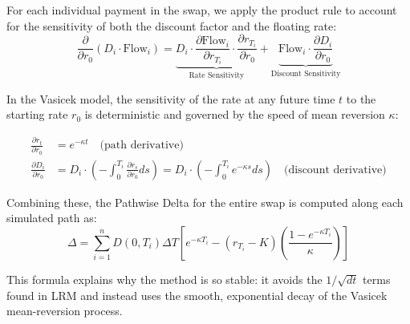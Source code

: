 For each individual payment in the swap, we apply the product rule to account for the sensitivity of both the discount factor and the floating rate:
\begin{equation}
\frac{\partial}{\partial r_0}(D_i\cdot\text{Flow}_i)=\underbrace{D_i\cdot\frac{\partial\text{Flow}_i}{\partial r_{T_i}}\cdot\frac{\partial r_{T_i}}{\partial r_0}}_{\text{Rate Sensitivity}}+\underbrace{\text{Flow}_i\cdot\frac{\partial D_i}{\partial r_0}}_{\text{Discount Sensitivity}}
\end{equation}

In the Vasicek model, the sensitivity of the rate at any future time $t$ to the starting rate $r_0$ is deterministic and governed by the speed of mean reversion $\kappa$:

\begin{equation}
\begin{aligned}
	\frac{\partial r_t}{\partial r_0} &= e^{-\kappa t} \quad\text{(path derivative)}\\
	\frac{\partial D_i}{\partial r_0} &= D_i\cdot\left(-\int_0^{T_i}\frac{\partial r_s}{\partial r_0}ds\right) = D_i\cdot\left(-\int_0^{T_i}e^{-\kappa s}ds\right)\quad\text{(discount derivative)}
\end{aligned}
\end{equation}

Combining these, the Pathwise Delta for the entire swap is computed along each simulated path as:
\begin{equation}
\Delta = \sum_{i=1}^n D(0,T_i)\Delta T\left[e^{-\kappa T_i}-(r_{T_i}-K)\left(\frac{1-e^{-\kappa T_i}}{\kappa}\right)\right]
\end{equation}

This formula explains why the method is so stable: it avoids the $1/\sqrt{dt}$ terms found in LRM and instead uses the smooth, exponential decay of the Vasicek mean-reversion process.

